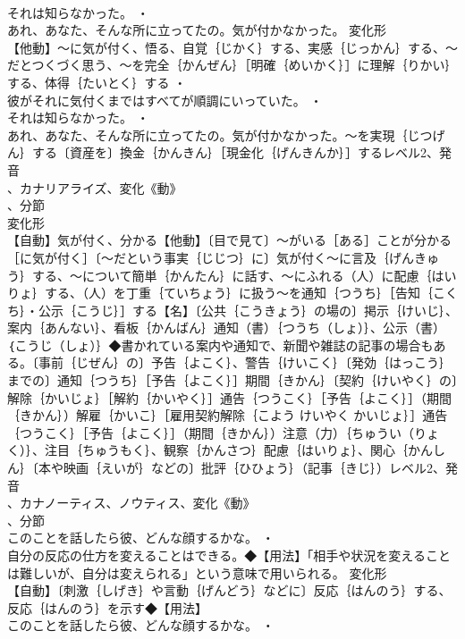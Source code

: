 \documentclass[8pt]{extreport}
\begin{document}
\begin{CJK}{UTF8}{min}
\\	それは知らなかった。 ・
\\	あれ、あなた、そんな所に立ってたの。気が付かなかった。	変化形 
\\	【他動】～に気が付く、悟る、自覚｛じかく｝する、実感｛じっかん｝する、～だとつくづく思う、～を完全｛かんぜん｝［明確｛めいかく｝］に理解｛りかい｝する、体得｛たいとく｝する ・
\\	彼がそれに気付くまではすべてが順調にいっていた。 ・
\\	それは知らなかった。 ・
\\	あれ、あなた、そんな所に立ってたの。気が付かなかった。～を実現｛じつげん｝する〔資産を〕換金｛かんきん｝［現金化｛げんきんか｝］するレベル2、発音
\\	、カナリアライズ、変化《動》
\\	、分節
\\	変化形 
\\	【自動】気が付く、分かる【他動】〔目で見て〕～がいる［ある］ことが分かる［に気が付く］〔～だという事実｛じじつ｝に〕気が付く～に言及｛げんきゅう｝する、～について簡単｛かんたん｝に話す、～にふれる（人）に配慮｛はいりょ｝する、（人）を丁重｛ていちょう｝に扱う～を通知｛つうち｝［告知｛こくち｝・公示｛こうじ｝］する【名】〔公共｛こうきょう｝の場の〕掲示｛けいじ｝、案内｛あんない｝、看板｛かんばん｝通知（書）｛つうち（しょ）｝、公示（書）｛こうじ（しょ）｝◆書かれている案内や通知で、新聞や雑誌の記事の場合もある。〔事前｛じぜん｝の〕予告｛よこく｝、警告｛けいこく｝〔発効｛はっこう｝までの〕通知｛つうち｝［予告｛よこく｝］期間｛きかん｝〔契約｛けいやく｝の〕解除｛かいじょ｝［解約｛かいやく｝］通告｛つうこく｝［予告｛よこく｝］（期間｛きかん｝）解雇｛かいこ｝［雇用契約解除｛こよう けいやく かいじょ｝］通告｛つうこく｝［予告｛よこく｝］（期間｛きかん｝）注意（力）｛ちゅうい（りょく）｝、注目｛ちゅうもく｝、観察｛かんさつ｝配慮｛はいりょ｝、関心｛かんしん｝〔本や映画｛えいが｝などの〕批評｛ひひょう｝（記事｛きじ｝）レベル2、発音
\\	、カナノーティス、ノウティス、変化《動》
\\	、分節
\\	このことを話したら彼、どんな顔するかな。 ・
\\	自分の反応の仕方を変えることはできる。◆【用法】「相手や状況を変えることは難しいが、自分は変えられる」という意味で用いられる。	変化形 
\\	【自動】〔刺激｛しげき｝や言動｛げんどう｝などに〕反応｛はんのう｝する、反応｛はんのう｝を示す◆【用法】
\\	このことを話したら彼、どんな顔するかな。 ・

\end{CJK}
\end{document}
